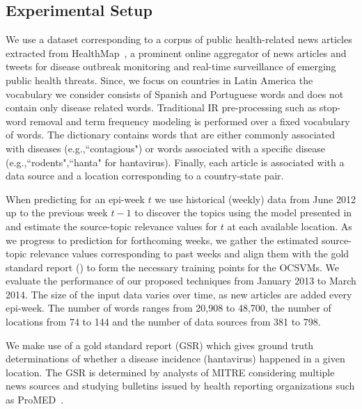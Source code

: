 \documentclass[twoside,leqno,twocolumn]{article}
\begin{document}
\subsection{Experimental Setup}
 We use a dataset corresponding to a corpus of public health-related news articles extracted from HealthMap~\cite{healthmap}, a prominent online aggregator of news articles and tweets for disease outbreak monitoring and real-time surveillance of emerging public health threats. Since, we focus on countries in Latin America the vocabulary we consider consists of Spanish and Portuguese words and does not contain only disease related words. Traditional IR pre-processing such as stop-word removal and term frequency modeling is performed over a fixed vocabulary of words. The dictionary contains words that are either commonly associated with diseases (e.g.,``contagious") or words associated with a specific disease (e.g.,``rodents",``hanta" for hantavirus). Finally, each article is associated with a data source and a location corresponding to a country-state pair.

When predicting for an epi-week $t$ we use historical (weekly) data from June 2012 up to the previous week $t-1$ to discover the topics using the model presented in  and estimate the source-topic relevance values for $t$ at each available location. As we progress to prediction for forthcoming weeks, we gather the estimated source-topic relevance values corresponding to past weeks and align them with the gold standard report () to  form the necessary training points for the OCSVMs. We evaluate the performance of our proposed techniques from January 2013 to March 2014. The size of the input data varies over time, as new articles are added every epi-week. The number of words ranges from 20,908 to 48,700, the number of locations from 74 to 144 and the number of data sources from 381 to 798.

 We make use of a gold standard report (GSR) which
gives ground truth determinations of whether a disease incidence
(hantavirus) happened in a given location. The GSR is determined by
analysts of MITRE considering multiple news sources and studying bulletins issued by health reporting organizations such as ProMED~\cite{probmed}.
\end{document}
